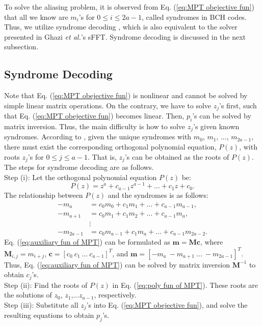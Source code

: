 \documentclass[journal,onecolumn,11pt]{IEEEtran}
\begin{document}
To solve the aliasing problem, it is observed from Eq. (\ref{eq:MPT obejective fun}) that all we know are $ m_{i}$'s for $0\leq i\leq 2a-1$, called syndromes in BCH codes.
Thus, we utilize syndrome decoding \cite{MacWilliams11977}, which is also equivalent to the solver presented in Ghazi {\em et al.}'s sFFT.
Syndrome decoding is discussed in the next subsection.

\subsection{Syndrome Decoding}\label{ssec:MPT}
Note that Eq. (\ref{eq:MPT obejective fun}) is nonlinear and cannot be solved by simple linear matrix operations.
On the contrary, we have to solve $z_j$'s first, such that Eq. (\ref{eq:MPT obejective fun}) becomes linear.
Then, $p_{i}$'s can be solved by matrix inversion.
Thus, the main difficulty is how to solve $z_j$'s given known syndromes.
According to \cite{Szego1975}, given the unique syndromes with $m_{0}$, $m_{1}$, ..., $m_{2a-1}$, there must exist the corresponding orthogonal polynomial equation, $P(z)$, with roots $z_{j}$'s for $0\leq j\leq a-1$.
That is, $z_{j}$'s can be obtained as the roots of $P(z)$.
The steps for syndrome decoding are as follows. \\
Step (i): Let the orthogonal polynomial equation $P(z)$ be:
\small
\begin{equation}
P(z)=z^{a}+c_{a-1}z^{a-1}+...+c_{1}z+c_{0}.
\label{eq:poly fun of MPT}
\end{equation}
\normalsize
The relationship between $P(z)$ and the syndromes is as follows:
\small
\begin{equation}
\begin{aligned}
    -m_{a}&=c_{0}m_{0}+c_{1}m_{1}+...+c_{a-1}m_{a-1}, \\
    -m_{a+1}&=c_{0}m_{1}+c_{1}m_{2}+...+c_{a-1}m_{a}, \\
                                                   &\vdots   \\
    -m_{2a-1}&=c_{0}m_{a-1}+c_{1}m_{a}+...+c_{a-1}m_{2a-2}.
\end{aligned}
\label{eq:auxiliary fun of MPT}
\end{equation}
\normalsize
Eq. (\ref{eq:auxiliary fun of MPT}) can be formulated as $\bm{m}=\bm{M}\bm{c}$, where $\bm{M}_{i,j}= m_{i+j}$, $\bm{c}=[c_{0} \ c_{1} \ ... \ c_{a-1} ]^T$, and $\bm{m}=[-m_{a} \ -m_{a+1} \ ... \ -m_{2a-1} ]^T$.
Thus, Eq. (\ref{eq:auxiliary fun of MPT}) can be solved by matrix inversion $\bm{M}^{-1}$ to obtain $c_{j}$'s.\\
Step (ii): Find the roots of $P(z)$ in Eq. (\ref{eq:poly fun of MPT}).
These roots are the solutions of $z_{0}$, $z_{1}$,...$z_{a-1}$, respectively.\\
Step (iii): Substitute all $z_{j}$'s into Eq. (\ref{eq:MPT obejective fun}), and solve the resulting equations to obtain $p_{j}$'s.
\end{document}
